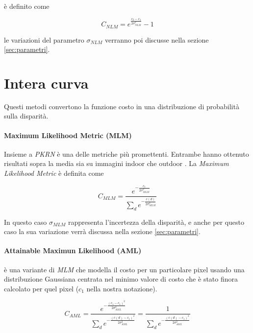 \documentclass[12pt]{report}
\begin{document}
				è definito come
				
				\begin{equation}
					C_{NLM}= e^{\frac{ c_{2}-c_{1}} {2\sigma_{NLM}^2}}-1
					\label{eq:NLM}
				\end{equation}
				
				\noindent le variazioni del parametro $\sigma_{NLM}$ verranno poi discusse nella sezione \ref{sec:parametri}.	
				
				
		\section{Intera curva}
		\label{sec:entireCost}
		
			Questi metodi convertono la funzione costo in una distribuzione di probabilità sulla disparità.
			
			\paragraph{Maximum Likelihood Metric (MLM)}
			\label{par:MLM}
			
				Insieme a \textit{PKRN} è una delle metriche più promettenti. Entrambe hanno ottenuto risultati sopra la media sia su immagini indoor che outdoor \cite{indoors_outdoors}.
				La \textit{Maximum Likelihood Metric} è definita come
				
				\begin{equation}
					C_{MLM}= \frac{e^{-\frac{c_{1}}{2\sigma_{MLM}^2}}}{\sum_{d} e^{-\frac{c(d)}{2\sigma_{MLM}^2}}}
					\label{eq:MLM}
				\end{equation}  	
			
				\noindent In questo caso $\sigma_{MLM}$ rappresenta l'incertezza della disparità, e anche per questo caso la sua variazione verrà discussa nella sezione \ref{sec:parametri}.
		
		
			\paragraph{Attainable Maximun Likelihood (AML)}
			\label{par:AML}
						
				è una variante di \textit{MLM} che modella il costo per un particolare pixel usando una distribuzione Gaussiana centrata nel minimo valore di costo che è stato finora calcolato per quel pixel ($c_{1}$ nella nostra notazione).
				
				\begin{equation}
					C_{AML}=\frac{e^{-\frac{(c_{1}-c_{1})^2}{2\sigma_{AML}^2}}}{\sum_{d} e^{-\frac{(c(d)-c_{1})^2}{2\sigma_{AML}^2}}}=\frac{1}{\sum_{d} e^{-\frac{(c(d)-c_{1})^2}{2\sigma_{AML}^2}}}
					\label{eq:AML}
				\end{equation} 
				
\end{document}
